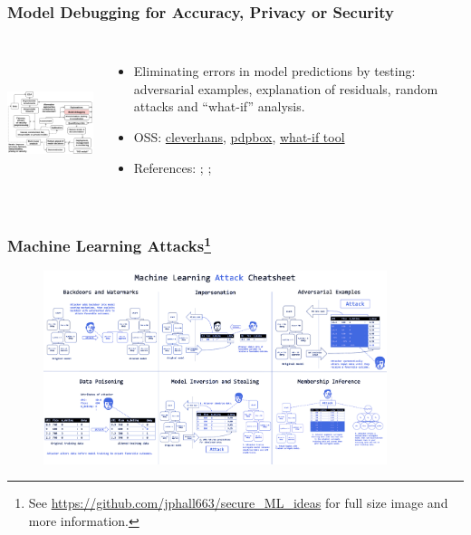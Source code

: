 \documentclass[11pt,
               aspectratio=169,
               hyperref={colorlinks}
               ]{beamer}
\begin{document}
			\begin{frame}
		
				\frametitle{Model Debugging for Accuracy, Privacy or Security}		
			
				\begin{columns}
	
					\centering
					\includegraphics[height=120pt]{../img/md.png}
				
					\vspace{-5pt}
					\scriptsize
					{\begin{itemize}
						\item Eliminating errors in model predictions by testing: adversarial examples, explanation of residuals, random attacks and ``what-if'' analysis.
						\item OSS: \href{https://github.com/tensorflow/cleverhans}{cleverhans}, \href{https://github.com/SauceCat/PDPbox}{pdpbox}, \href{https://pair-code.github.io/what-if-tool/index.html}{what-if tool}
						\item References: ; ; 
					\end{itemize}}
					\normalsize
				
				\end{columns}			
			
			\end{frame}
			
			\begin{frame}	
			
				\frametitle{Machine Learning Attacks\footnote{\tiny{See \url{https://github.com/jphall663/secure_ML_ideas} for full size image and more information.}}}		
			
				\begin{figure}[htb]
					\begin{center}
						\includegraphics[height=160pt]{../img/cheatsheet_blue.png}
					\end{center}
				\end{figure}	
			\end{frame}
			
\end{document}
